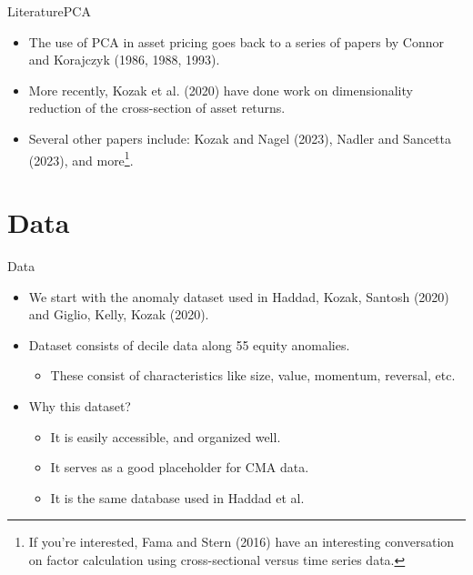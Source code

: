 \documentclass[dvipsnames,mathserif, handout]{beamer}
\begin{document}
{\begin{frame}{Literature}{PCA}
	\begin{itemize}
		\item The use of PCA in asset pricing goes back to a series of papers by Connor and Korajczyk (1986, 1988, 1993).
		\item More recently, Kozak et al. (2020) have done work on dimensionality reduction of the cross-section of asset returns.
		\item Several other papers include: Kozak and Nagel (2023), Nadler and Sancetta (2023), and more\footnote{\tiny If you're interested, Fama and Stern (2016) have an interesting conversation on factor calculation using cross-sectional versus time series data.}.
	\end{itemize}
\end{frame}


\section{Data}

\begin{frame}{Data}
	\begin{itemize}
		\item We start with the anomaly dataset used in Haddad, Kozak, Santosh (2020) and Giglio, Kelly, Kozak (2020).
		\item Dataset consists of decile data along 55 equity anomalies.
		\begin{itemize}
			\item These consist of characteristics like size, value, momentum, reversal, etc.
		\end{itemize}
		\item Why this dataset? 
		\begin{itemize}
			\item It is easily accessible, and organized well.
			\item It serves as a good placeholder for CMA data.
			\item It is the same database used in Haddad et al. 
		\end{itemize}
	\end{itemize}
\end{frame}

}
\end{document}
